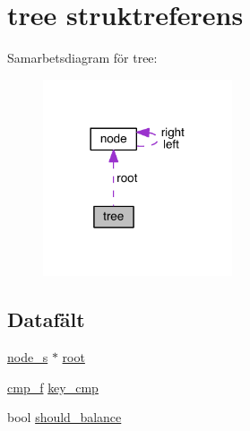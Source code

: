 \hypertarget{structtree}{\section{tree struktreferens}
\label{structtree}
}


Samarbetsdiagram för tree\+:
\nopagebreak
\begin{figure}[H]
\begin{center}
\leavevmode
\includegraphics[width=158pt]{structtree__coll__graph}
\end{center}
\end{figure}
\subsection*{Datafält}
\begin{DoxyCompactItemize}
\item 
\hyperlink{node_8h_aeed67813c57d1b99aba54f16aa01639f}{node\+\_\+s} $\ast$ \hyperlink{structtree_a752f44752a2b0a0ba6fb3f434d7feea6}{root}
\item 
\hyperlink{tree_8h_ac9404bce0090a72ec95c26c1fc58e4dd}{cmp\+\_\+f} \hyperlink{structtree_ad2c95bd73b4c3f1ace5705b380c971cb}{key\+\_\+cmp}
\item 
bool \hyperlink{structtree_a71c5140877d3e8978670898bfb87cb07}{should\+\_\+balance}
\end{DoxyCompactItemize}


